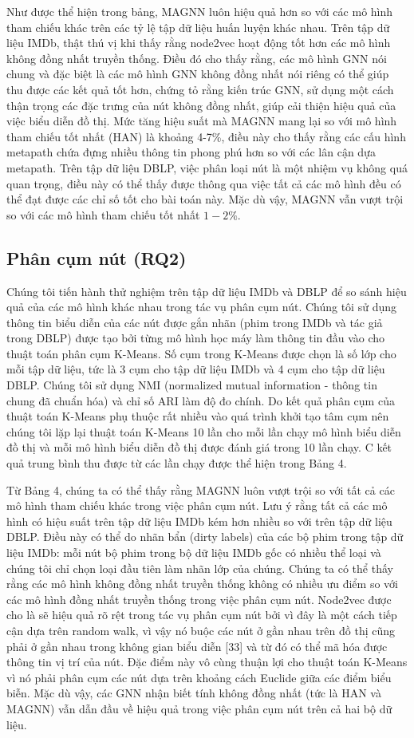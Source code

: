 Như được thể hiện trong bảng, MAGNN luôn hiệu quả hơn so với các mô hình tham chiếu khác trên các tỷ lệ tập dữ liệu huấn luyện khác nhau. Trên tập dữ liệu IMDb, thật thú vị khi thấy rằng node2vec hoạt động tốt hơn các mô hình không đồng nhất truyền thống. Điều đó cho thấy rằng, các mô hình GNN nói chung và đặc biệt là các mô hình GNN không đồng nhất nói riêng có thể giúp thu được các kết quả tốt hơn, chứng tỏ rằng kiến trúc GNN, sử dụng một cách thận trọng các đặc trưng của nút không đồng nhất, giúp cải thiện hiệu quả của việc biểu diễn đồ thị. Mức tăng hiệu suất mà MAGNN mang lại so với mô hình tham chiếu tốt nhất (HAN) là khoảng 4-7\%, điều này cho thấy rằng các cấu hình metapath chứa đựng nhiều thông tin phong phú hơn so với các lân cận dựa metapath. Trên tập dữ liệu DBLP, việc phân loại nút là một nhiệm vụ không quá quan trọng, điều này có thể thấy được thông qua việc tất cả các mô hình đều có thể đạt được các chỉ số tốt cho bài toán này. Mặc dù vậy, MAGNN vẫn vượt trội so với các mô hình tham chiếu tốt nhất $1-2 \%$.


\subsection{Phân cụm nút (RQ2)}
Chúng tôi tiến hành thử nghiệm trên tập dữ liệu IMDb và DBLP để so sánh hiệu quả của các mô hình khác nhau trong tác vụ phân cụm nút. Chúng tôi sử dụng thông tin biểu diễn của các nút được gắn nhãn (phim trong IMDb và tác giả trong DBLP) được tạo bởi từng mô hình học máy làm thông tin đầu vào cho thuật toán phân cụm K-Means. Số cụm trong K-Means được chọn là số lớp cho mỗi tập dữ liệu, tức là 3 cụm cho tập dữ liệu IMDb và 4 cụm cho tập dữ liệu DBLP. Chúng tôi sử dụng NMI (normalized mutual information - thông tin chung đã chuẩn hóa) và chỉ số ARI làm độ đo chính. Do kết quả phân cụm của thuật toán K-Means phụ thuộc rất nhiều vào quá trình khởi tạo tâm cụm nên chúng tôi lặp lại thuật toán K-Means 10 lần cho mỗi lần chạy mô hình biểu diễn đồ thị và mỗi mô hình biểu diễn đồ thị được đánh giá trong 10 lần chạy. C kết quả trung bình thu được từ các lần chạy được thể hiện trong Bảng 4.

Từ Bảng 4, chúng ta có thể thấy rằng MAGNN luôn vượt trội so với tất cả các mô hình tham chiếu khác trong việc phân cụm nút. Lưu ý rằng tất cả các mô hình có hiệu suất trên tập dữ liệu IMDb kém hơn nhiều so với trên tập dữ liệu DBLP. Điều này có thể do nhãn bẩn (dirty labels) của các bộ phim trong tập dữ liệu IMDb: mỗi nút bộ phim trong bộ dữ liệu IMDb gốc có nhiều thể loại và chúng tôi chỉ chọn loại đầu tiên làm nhãn lớp của chúng. Chúng ta có thể thấy rằng các mô hình không đồng nhất truyền thống không có nhiều ưu điểm so với các mô hình đồng nhất truyền thống trong việc phân cụm nút. Node2vec được cho là sẽ hiệu quả rõ rệt trong tác vụ phân cụm nút bởi vì đây là một cách tiếp cận dựa trên random walk, vì vậy nó buộc các nút ở gần nhau trên đồ thị cũng phải ở gần nhau trong không gian biểu diễn [33] và từ đó có thể mã hóa được thông tin vị trí của nút. Đặc điểm này vô cùng thuận lợi cho thuật toán K-Means vì nó phải phân cụm các nút dựa trên khoảng cách Euclide giữa các điểm biểu biễn. Mặc dù vậy, các GNN nhận biết tính không đồng nhất (tức là HAN và MAGNN) vẫn dẫn đầu về hiệu quả trong việc phân cụm nút trên cả hai bộ dữ liệu.


